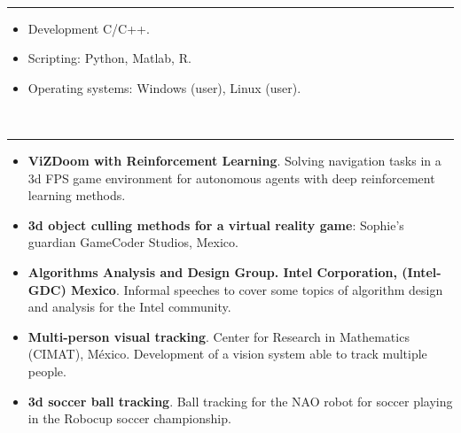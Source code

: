 \documentclass[10 pt]{article}
\newcommand{\mypartitle}[2][2.]{\vspace*{-#1 ex}~\\{\noindent {\bf #2}}}
\begin{document}
\newpage

\mypartitle{Skills}
\medskip
\hrule height 0.05cm

\begin{itemize}[noitemsep]
\item Development C/C++.
\item Scripting: Python,  Matlab, R.
\item Operating systems: Windows (user), Linux (user).
\end{itemize}

\mypartitle{Projects}
\medskip
\hrule height 0.05cm

\begin{itemize}[noitemsep]


\item \textbf{ViZDoom with Reinforcement Learning}. Solving navigation tasks in a 3d FPS game 
environment for autonomous agents with deep reinforcement learning methods.

\item \textbf{3d object culling methods for a virtual reality game}: Sophie's guardian GameCoder Studios, Mexico.

\item \textbf{Algorithms Analysis and Design Group. Intel Corporation, (Intel-GDC) Mexico}. 
Informal speeches to cover some topics of algorithm design and analysis for the Intel community.


\item \textbf{Multi-person visual tracking}. Center for Research in Mathematics (CIMAT), México. 
Development of a vision system able to track multiple people.

\item \textbf{3d soccer ball tracking}. Ball tracking for the NAO robot for soccer playing in the Robocup soccer championship.


\end{itemize}
\end{document}
